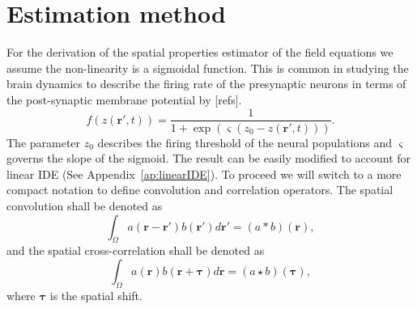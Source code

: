\documentclass[10pt,twocolumn,twoside]{IEEEtran}
\begin{document}
\section{Estimation method}\label{sec:EstimationMethod}
For the derivation of the spatial properties estimator of the field equations we assume the non-linearity is a sigmoidal function. This is common in studying the brain dynamics to describe the firing rate of the presynaptic neurons in terms of the post-synaptic membrane potential by [refs].
\begin{equation}
	\label{ActivationFunction} f\left( z\left( \mathbf{r}', t \right) \right) = \frac{1}{1 + \exp \left( \varsigma \left( z_0 - z\left(\mathbf{r}',t\right) \right) \right)}. 
\end{equation}
The parameter $z_0$ describes the firing threshold of the neural populations and $\varsigma$ governs the slope of the sigmoid. The result can be easily modified to account for linear IDE (See Appendix~\ref{ap:linearIDE}). To proceed we will switch to a more compact notation to define convolution and correlation operators. The spatial convolution shall be denoted as
\begin{equation}
	\int_\Omega a(\mathbf{r}-\mathbf{r}')b(\mathbf{r}')d\mathbf{r}' = (a\ast b)(\mathbf{r}),
\end{equation}
and the spatial cross-correlation shall be denoted as 
\begin{equation}
	\int_\Omega a(\mathbf{r})b(\mathbf{r}+\boldsymbol{\tau})d\mathbf{r} = (a\star b)(\boldsymbol{\tau}),
\end{equation} 
where $\boldsymbol{\tau}$ is the spatial shift.
\end{document}
